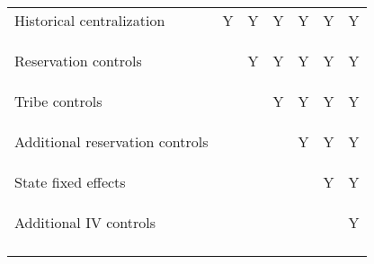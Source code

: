 \begin{center}
\begin{tabular}{lcccccc}
\noalign{\smallskip}Historical centralization & Y & Y & Y & Y & Y & Y\\
Reservation controls & \begin{footnotesize}\end{footnotesize} & \begin{footnotesize}Y\end{footnotesize} & \begin{footnotesize}Y\end{footnotesize} & \begin{footnotesize}Y\end{footnotesize} & \begin{footnotesize}Y\end{footnotesize} & \begin{footnotesize}Y\end{footnotesize}\\
Tribe controls &  &  & Y & Y & Y & Y\\
Additional reservation controls & \begin{footnotesize}\end{footnotesize} & \begin{footnotesize}\end{footnotesize} & \begin{footnotesize}\end{footnotesize} & \begin{footnotesize}Y\end{footnotesize} & \begin{footnotesize}Y\end{footnotesize} & \begin{footnotesize}Y\end{footnotesize}\\
State fixed effects &  &  &  &  & Y & Y\\
Additional IV controls & \begin{footnotesize}\end{footnotesize} & \begin{footnotesize}\end{footnotesize} & \begin{footnotesize}\end{footnotesize} & \begin{footnotesize}\end{footnotesize} & \begin{footnotesize}\end{footnotesize} & \begin{footnotesize}Y\end{footnotesize}\\
\noalign{\smallskip}\hline\end{tabular}
\end{center}
